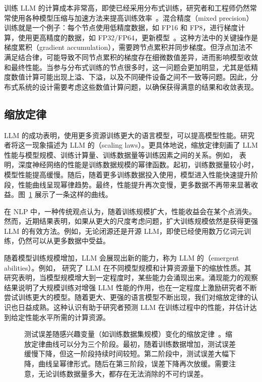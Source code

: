 训练 LLM 的计算成本非常高，即使已经采用分布式训练，研究者和工程师仍然常常使用各种模型压缩与加速方法来提高训练效率~\cite{weng:2021large}。混合精度（mixed precision）训练就是一个例子：每个节点使用低精度数据，如 FP16 和 FP8，进行梯度计算，使用更高精度的数据，如 FP32/FP64，更新模型~\cite{micikevicius-etal:2018mixed}。这种方法中的关键操作是梯度累积（gradient accumulation），需要跨节点累积并同步梯度。但浮点加法不满足结合律，可能导致不同节点累积的梯度存在细微数值差异，进而影响模型收敛和最终性能。当参与分布式训练的节点很多时，这一问题会更加明显，尤其是低精度数值计算可能出现上溢、下溢，以及不同硬件设备之间不一致等问题。因此，分布式系统的设计需要考虑这些数值计算问题，以确保获得满意的结果和收敛表现。

\subsection{缩放定律}

\noindent LLM 的成功表明，使用更多资源训练更大的语言模型，可以提高模型性能。研究者将这一现象描述为 LLM 的（scaling laws）。更具体地说，缩放定律刻画了 LLM 性能与模型规模、训练计算量、训练数据量等训练因素之间的关系。例如，\citet{hestness-etal:2017deep} 表明，深度神经网络的性能是训练数据规模的幂律函数。起初，训练数据量较小时，模型性能提高缓慢。随后，随着更多训练数据投入使用，模型进入性能快速提升阶段，性能曲线呈现幂律趋势。最终，性能提升再次变慢，更多数据不再带来显著收益。图~\ref{fig:scaling-power-law-curve} 展示了一条这样的曲线。

在 NLP 中，一种传统观点认为，随着训练规模扩大，性能收益会在某个点消失。然而，近期结果表明，如果从更大的尺度考虑问题，扩大训练规模依然是获得更强 LLM 的有效方法。例如，无论闭源还是开源 LLM，即使已经使用数万亿词元训练，仍然可以从更多数据中受益。

随着模型训练规模增加，LLM 会展现出新的能力，称为 LLM 的（emergent abilities）。例如，\citet{wei-etal:2022emergent} 研究了 LLM 在不同模型规模和计算资源量下的缩放性质。其研究表明，当模型规模增大到一定程度时，某些能力会涌现出来。涌现能力的观察结果说明了大规模训练对增强 LLM 性能的作用，也在一定程度上激励研究者不断尝试训练更大的模型。随着更大、更强的语言模型不断出现，我们对缩放定律的认识也日益成熟。这种认识有助于研究者预测 LLM 在训练过程中的性能，并估计达到给定性能水平所需的计算资源。

\begin{figure}[!t]
\centering

\caption{测试误差随感兴趣变量（如训练数据集规模）变化的缩放定律~\cite{hestness-etal:2017deep}。缩放定律曲线可以分为三个阶段。最初，随着训练数据增加，测试误差缓慢下降，但这一阶段持续时间较短。第二阶段中，测试误差大幅下降，曲线呈幂律形式。随后在第三阶段，误差下降再次放缓。需要注意，无论训练数据量多大，都存在无法消除的不可约误差。}
\label{fig:scaling-power-law-curve}
\end{figure}

